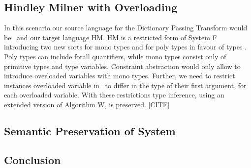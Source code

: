 \subsection{Hindley Milner with Overloading}
In this scenario our source language for the Dictionary Passing Transform would be \HMo\ and our target language HM. HM is a restricted form of System F introducing two new sorts  for mono types and  for poly types in favour of types . Poly types can include forall quantifiers, while mono types consist only of primitive types and type variables. Constraint abstraction would only allow to introduce overloaded variables with mono types. Further, we need to restrict instances overloaded variable  in \HMo\ to differ in the type of their first argument, for each overloaded variable. With these restrictions type inference, using an extended version of Algorithm W, is preserved. [CITE]

\subsection{Semantic Preservation of System \Fo}

\subsection{Conclusion}